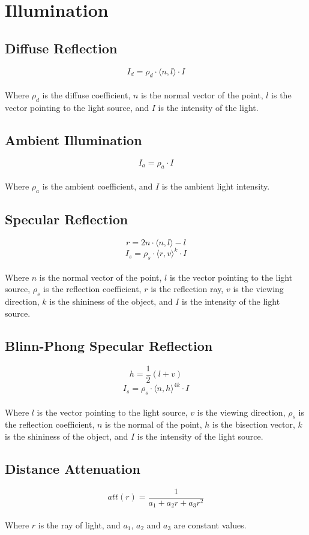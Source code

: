 \documentclass{article}
\begin{document}
\section{Illumination}
\subsection{Diffuse Reflection}
\vspace{.3cm}
\[ I_d = \rho_d \cdot \langle n, l \rangle \cdot I \] \\
Where $\rho_d$ is the diffuse coefficient, $n$ is the normal vector of the point, $l$ is the vector pointing to the light source, and $I$ is the intensity of the light.

\subsection{Ambient Illumination}
\vspace{.3cm}
\[ I_a = \rho_a \cdot I \] \\
Where $\rho_a$ is the ambient coefficient, and $I$ is the ambient light intensity.

\subsection{Specular Reflection}
\vspace{.3cm}
\[ r = 2n \cdot \langle n, l \rangle - l \]
\[ I_s = \rho_s \cdot \langle r, v \rangle^k \cdot I \] \\
Where $n$ is the normal vector of the point, $l$ is the vector pointing to the light source, $\rho_s$ is the reflection coefficient, $r$ is the reflection ray, $v$ is the viewing direction, $k$ is the shininess of the object, and $I$ is the intensity of the light source.

\subsection{Blinn-Phong Specular Reflection}
\vspace{.3cm}
\[ h = \frac{1}{2}(l + v) \]
\[ I_s = \rho_s \cdot \langle n, h \rangle^{4k} \cdot I \] \\
Where $l$ is the vector pointing to the light source, $v$ is the viewing direction, $\rho_s$ is the reflection coefficient, $n$ is the normal of the point, $h$ is the bisection vector, $k$ is the shininess of the object, and $I$ is the intensity of the light source.

\subsection{Distance Attenuation}
\vspace{.3cm}
\[ att(r) = \frac{1}{a_1 + a_2r + a_3r^2} \] \\
Where $r$ is the ray of light, and $a_1$, $a_2$ and $a_3$ are constant values.
\end{document}
